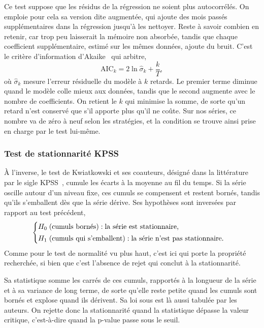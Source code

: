 Ce test suppose que les résidus de la régression ne soient plus autocorrélés.
On emploie pour cela sa version dite augmentée, qui ajoute des mois passés
supplémentaires dans la régression jusqu'à les nettoyer. Reste à savoir
combien en retenir, car trop peu laisserait la mémoire non absorbée, tandis
que chaque coefficient supplémentaire, estimé sur les mêmes données, ajoute du
bruit. C'est le critère d'information d'Akaike~\cite{akaike1974} qui arbitre,
\[
  \mathrm{AIC}_k = 2\ln \hat\sigma_k + \frac{k}{T},
\]
où \(\hat\sigma_k\) mesure l'erreur résiduelle du modèle à \(k\) retards. Le
premier terme diminue quand le modèle colle mieux aux données, tandis que le
second augmente avec le nombre de coefficients. On retient le \(k\) qui
minimise la somme, de sorte qu'un retard n'est conservé que s'il apporte plus
qu'il ne coûte. Sur nos séries, ce nombre va de zéro à neuf selon les
stratégies, et la condition se trouve ainsi prise en charge par le test
lui-même.

\subsubsection*{Test de stationnarité KPSS}

À l'inverse, le test de Kwiatkowski et ses coauteurs, désigné dans la
littérature par le sigle KPSS~\cite{kpss1992}, cumule les écarts à la moyenne
au fil du temps. Si la série oscille autour d'un niveau fixe, ces cumuls se
compensent et restent bornés, tandis qu'ils s'emballent dès que la série
dérive. Ses hypothèses sont inversées par rapport au test précédent,
\[
  \begin{cases}
    H_0 \;(\text{cumuls bornés}) : \text{la série est stationnaire,}\\[2pt]
    H_1 \;(\text{cumuls qui s'emballent}) : \text{la série n'est pas stationnaire.}
  \end{cases}
\]
Comme pour le test de normalité vu plus haut, c'est ici \Hzero{} qui porte la
propriété recherchée, si bien que c'est l'absence de rejet qui conclut à la
stationnarité.

Sa statistique somme les carrés de ces cumuls, rapportés à la longueur de la
série et à sa variance de long terme, de sorte qu'elle reste petite quand les
cumuls sont bornés et explose quand ils dérivent. Sa loi sous \Hzero{} est là
aussi tabulée par les auteurs. On rejette donc la stationnarité quand la
statistique dépasse la valeur critique, c'est-à-dire quand la p-value passe
sous le seuil.

